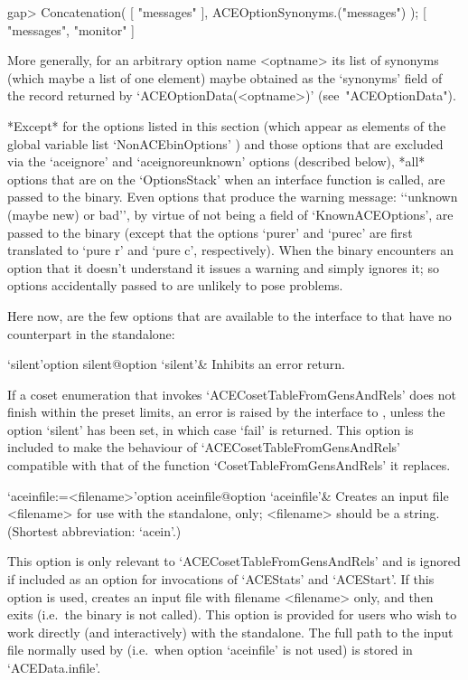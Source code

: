 \beginexample
gap> Concatenation( [ "messages" ], ACEOptionSynonyms.("messages") );
[ "messages", "monitor" ]
\endexample

More generally, for an arbitrary option name  <optname>  its  list  of
synonyms (which maybe a list of one element)  maybe  obtained  as  the
`synonyms' field of the record returned by  `ACEOptionData(<optname>)'
(see~"ACEOptionData").


*Except* for the options listed  in  this  section  (which  appear  as
elements of the global  variable  list  `NonACEbinOptions'{\undoquotes
{}})  and  those  options
that are excluded via the `aceignore' and  `aceignoreunknown'  options
(described below), *all* options that are on the  `OptionsStack'  when
an {\ACE} interface function is  called,  are  passed  to  the  {\ACE}
binary. Even options that produce the warning  message:  \lq{}`unknown
(maybe  new)  or  bad'',  by  virtue  of  not   being   a   field   of
`KnownACEOptions', are passed to the {\ACE} binary  (except  that  the
options `purer' and `purec' are first translated to `pure r' and `pure
c', respectively). When the {\ACE} binary encounters an option that it
doesn't understand it issues a  warning  and  simply  ignores  it;  so
options accidentally passed to {\ACE} are unlikely to pose problems.

Here now, are the  few  options  that  are  available  to  the  {\GAP}
interface to {\ACE} that have no counterpart in the {\ACE} standalone:

\beginitems

\>`silent'{option silent}@{option `silent'}& 
Inhibits an error return.

If a coset  enumeration  that  invokes  `ACECosetTableFromGensAndRels'
does not finish within the preset limits, an error is  raised  by  the
interface to {\GAP}, unless the option `silent' has been set, in which
case `fail' is returned. This option is included to make the behaviour
of `ACECosetTableFromGensAndRels' compatible with that of the function
`CosetTableFromGensAndRels' it replaces.

\>`aceinfile:=<filename>'{option aceinfile}@{option `aceinfile'}&
Creates an {\ACE} input file <filename> for use with  the  standalone,
only;  <filename>  should  be  a  string.
(Shortest abbreviation: `acein'.)

This option is only relevant to `ACECosetTableFromGensAndRels' and  is
ignored if included as an option for  invocations  of  `ACEStats'  and
`ACEStart'. If this option is used, {\GAP} creates an input file  with
filename <filename> only, and then exits (i.e.~the  {\ACE}  binary  is
not called). This option is  provided  for  users  who  wish  to  work
directly (and interactively) with the {\ACE} standalone. The full path
to  the  input  file  normally  used  by  {\ACE}   (i.e.~when   option
`aceinfile' is not used) is stored in `ACEData.infile'.


